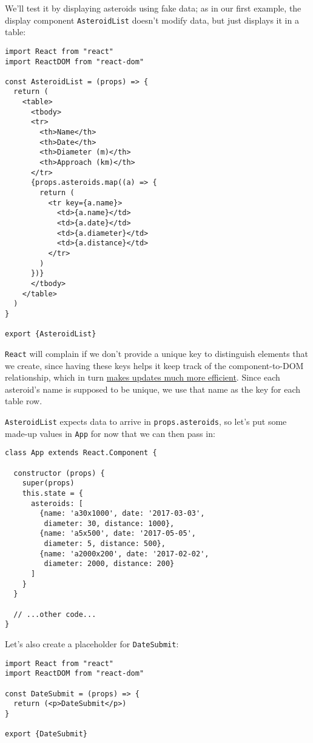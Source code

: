 We'll test it by displaying asteroids using fake data;
as in our first example,
the display component \texttt{AsteroidList} doesn't modify data,
but just displays it in a table:

\begin{verbatim}
import React from "react"
import ReactDOM from "react-dom"

const AsteroidList = (props) => {
  return (
    <table>
      <tbody>
      <tr>
        <th>Name</th>
        <th>Date</th>
        <th>Diameter (m)</th>
        <th>Approach (km)</th>
      </tr>
      {props.asteroids.map((a) => {
        return (
          <tr key={a.name}>
            <td>{a.name}</td>
            <td>{a.date}</td>
            <td>{a.diameter}</td>
            <td>{a.distance}</td>
          </tr>
        )
      })}
      </tbody>
    </table>
  )
}

export {AsteroidList}
\end{verbatim}

\texttt{React} will complain if we don't provide a unique key
to distinguish elements that we create,
since having these keys helps it keep track of the component-to-DOM relationship,
which in turn \href{https://stackoverflow.com/questions/28329382/understanding-unique-keys-for-array-children-in-react-js}{makes updates much more efficient}.
Since each asteroid's name is supposed to be unique,
we use that name as the key for each table row.

\texttt{AsteroidList} expects data to arrive in \texttt{props.asteroids},
so let's put some made-up values in \texttt{App} for now
that we can then pass in:

\begin{verbatim}
class App extends React.Component {

  constructor (props) {
    super(props)
    this.state = {
      asteroids: [
        {name: 'a30x1000', date: '2017-03-03',
         diameter: 30, distance: 1000},
        {name: 'a5x500', date: '2017-05-05',
         diameter: 5, distance: 500},
        {name: 'a2000x200', date: '2017-02-02',
         diameter: 2000, distance: 200}
      ]
    }
  }

  // ...other code...
}
\end{verbatim}

\noindent
Let's also create a placeholder for \texttt{DateSubmit}:

\begin{verbatim}
import React from "react"
import ReactDOM from "react-dom"

const DateSubmit = (props) => {
  return (<p>DateSubmit</p>)
}

export {DateSubmit}
\end{verbatim}

